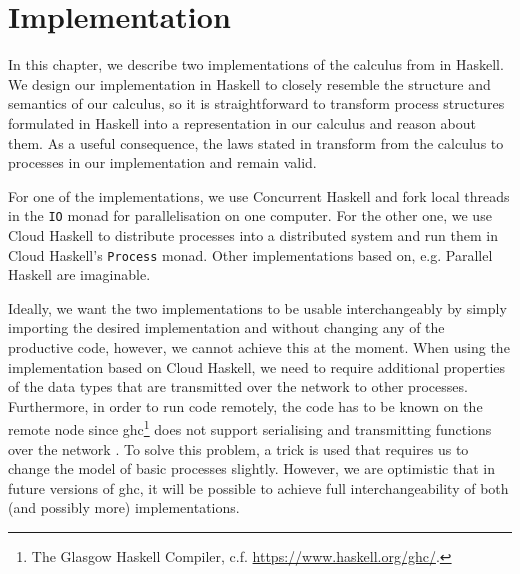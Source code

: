
\chapter{Implementation}
\label{chp:implementation}
In this chapter, we describe two implementations of the calculus from  in \textsf{Haskell}. We design our implementation in \textsf{Haskell} to closely resemble the structure and semantics of our calculus, so it is straightforward to transform process structures formulated in \textsf{Haskell} into a representation in our calculus and reason about them. As a useful consequence, the laws stated in  transform from the calculus to processes in our implementation and remain valid.

For one of the implementations, we use \textsf{Concurrent Haskell} and fork local threads in the \texttt{IO} monad for parallelisation on one computer. For the other one, we use \textsf{Cloud Haskell} to distribute processes into a distributed system and run them in \textsf{Cloud Haskell}'s \texttt{Process} monad. Other implementations based on, e.g. \textsf{Parallel Haskell} are imaginable.

Ideally, we want the two implementations to be usable interchangeably by simply importing the desired implementation and without changing any of the productive code, however, we cannot achieve this at the moment. When using the implementation based on \textsf{Cloud Haskell}, we need to require additional properties of the data types that are transmitted over the network to other processes. Furthermore, in order to run code remotely, the code has to be known on the remote node since \textsf{ghc}\footnote{The Glasgow Haskell Compiler, c.f. \url{https://www.haskell.org/ghc/}.} does not support serialising and transmitting functions over the network \cite{Epstein:2011:THC:2034675.2034690}. To solve this problem, a trick is used that requires us to change the model of basic processes slightly. However, we are optimistic that in future versions of \textsf{ghc}, it will be possible to achieve full interchangeability of both (and possibly more) implementations.


\clearpage

